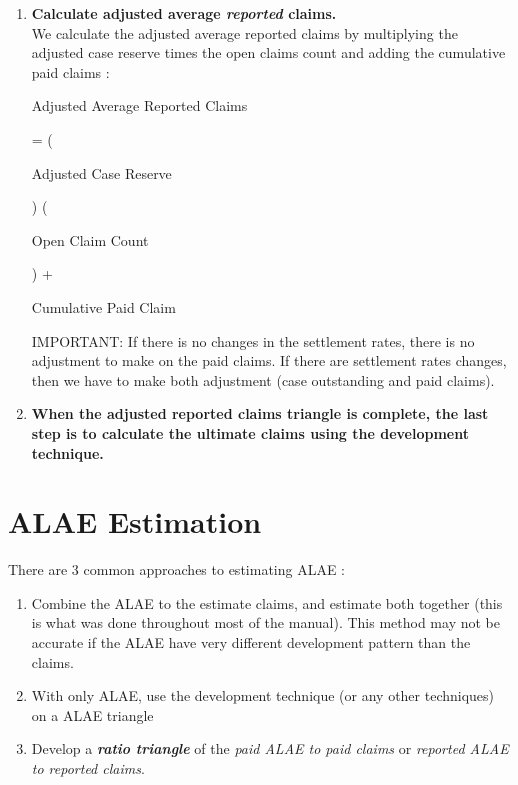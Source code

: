 \documentclass[11pt, english]{memoir}
\numberwithin{definition}{section}
\begin{document}
\begin{enumerate}
		\item \textbf{Calculate adjusted average \emph{reported} claims.}\\
		We calculate the adjusted average reported claims by  multiplying the adjusted case reserve times the open claims count and adding the cumulative paid claims  :
		\begin{tcolorbox}
		\begin{minipage}{0.22\linewidth}\centering
			Adjusted Average Reported Claims
		\end{minipage} = 
		\left(\begin{minipage}{0.18\linewidth}\centering
			Adjusted Case Reserve
		\end{minipage}\right)
		\left(\begin{minipage}{0.15\linewidth}\centering
			Open Claim Count
		\end{minipage}\right) + 
		\begin{minipage}{0.18\linewidth}\centering
			Cumulative Paid Claim
		\end{minipage}
		\end{tcolorbox}
		
		
		IMPORTANT: If there is no changes in the settlement rates, there is no adjustment to make on the paid claims. If there are settlement rates changes, then we have to make both adjustment (case outstanding and paid claims). \\
	
	
	
		\item \textbf{When the adjusted reported claims triangle is complete, the last step is to calculate the ultimate claims using the development technique.} 
	\end{enumerate}
	
	
	
	
	
	
	
	
	
	
	
	
	
	
	
	
\chapter{ALAE Estimation}

There are 3 common approaches to estimating ALAE : 
\begin{enumerate}
	\item Combine the ALAE to the estimate claims, and estimate both together (this is what was done throughout most of the manual). This method may not be accurate if the ALAE have very different development pattern than the claims.
	\item With only ALAE, use the development technique (or any other techniques) on a ALAE triangle
	\item Develop a \textbf{\emph{ratio triangle}} of the \emph{paid ALAE to paid claims} or \emph{reported ALAE to reported claims}. 
\end{enumerate}
	
\end{document}
